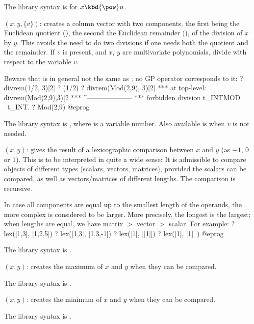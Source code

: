The library syntax is 
for $x\hbox{\kbd{\pow}}n$.


$(x,y,\{v\})$: \label{se:divrem}creates a column vector with two components, the first being the Euclidean
quotient (), the second the Euclidean remainder
(), of the division of $x$ by $y$. This avoids the
need to do two divisions if one needs both the quotient and the remainder.
If $v$ is present, and $x$, $y$ are multivariate
polynomials, divide with respect to the variable $v$.

Beware that  is in general not the same as
; no GP operator corresponds to it:
\bprog
? divrem(1/2, 3)[2]
? (1/2) %
? divrem(Mod(2,9), 3)[2]
 ***   at top-level: divrem(Mod(2,9),3)[2
 ***                 ^--------------------
 ***   forbidden division t_INTMOD \ t_INT.
? Mod(2,9) %
@eprog

The library syntax is , where  is a variable number.
Also available is  when $v$ is
not needed.

$(x,y)$: \label{se:lex}gives the result of a lexicographic comparison
between $x$ and $y$ (as $-1$, $0$ or $1$). This is to be interpreted in quite
a wide sense: It is admissible to compare objects of different types
(scalars, vectors, matrices), provided the scalars can be compared, as well
as vectors/matrices of different lengths. The comparison is recursive.

In case all components are equal up to the smallest length of the operands,
the more complex is considered to be larger. More precisely, the longest is
the largest; when lengths are equal, we have matrix $>$ vector $>$ scalar.
For example:
\bprog
? lex([1,3], [1,2,5])
? lex([1,3], [1,3,-1])
? lex([1], [[1]])
? lex([1], [1]~)
@eprog

The library syntax is .

$(x,y)$: \label{se:max}creates the maximum of $x$ and $y$ when they can be compared.

The library syntax is .

$(x,y)$: \label{se:min}creates the minimum of $x$ and $y$ when they can be compared.

The library syntax is .

